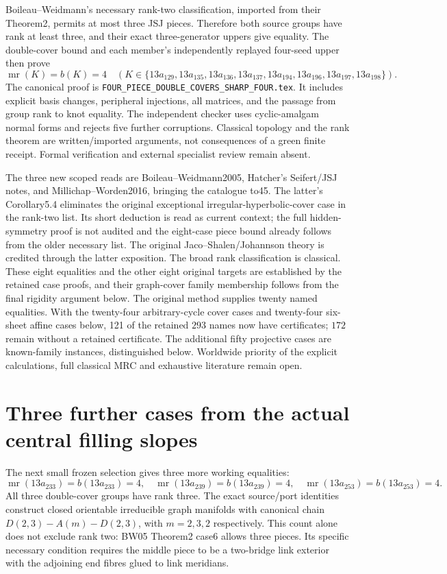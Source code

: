 \documentclass[11pt]{article}
\newcommand{\mr}{\operatorname{mr}}
\begin{document}
Boileau--Weidmann's necessary rank-two classification, imported from
their Theorem2, permits at most three JSJ pieces. Therefore both source
groups have rank at least three, and their exact three-generator uppers
give equality. The double-cover bound and each member's independently
replayed four-seed upper then prove
\[
 \mr(K)=b(K)=4\quad
 (K\in\{13a_{129},13a_{135},13a_{136},13a_{137},
        13a_{194},13a_{196},13a_{197},13a_{198}\}).
\]
The canonical proof is \texttt{FOUR\_PIECE\_DOUBLE\_COVERS\_SHARP\_FOUR.tex}.
It includes explicit basis changes, peripheral injections, all matrices,
and the passage from group rank to knot equality. The independent
checker uses cyclic-amalgam normal forms and rejects five further
corruptions. Classical topology and the rank theorem are written/imported
arguments, not consequences of a green finite receipt. Formal verification
and external specialist review remain absent.

The three new scoped reads are Boileau--Weidmann2005, Hatcher's
Seifert/JSJ notes, and Millichap--Worden2016, bringing the catalogue to45.
The latter's Corollary5.4 eliminates the original exceptional
irregular-hyperbolic-cover case in the rank-two list. Its short deduction
is read as current context; the full hidden-symmetry proof is not audited
and the eight-case piece bound already follows from the older necessary
list. The original
Jaco--Shalen/Johannson theory is credited through the latter exposition.
The broad rank classification is classical. These eight equalities and
the other eight original targets are established by the retained case
proofs, and their graph-cover family membership follows from the final
rigidity argument below. The original method supplies twenty named equalities. With the
twenty-four arbitrary-cycle cover cases and twenty-four six-sheet
affine cases below, 121 of the retained $293$ names now have certificates; $172$ remain without
a retained certificate. The additional fifty projective cases are
known-family instances, distinguished below. Worldwide priority of
the explicit calculations, full classical MRC and exhaustive literature
remain open.

\clearpage
\section{Three further cases from the actual central filling slopes}

The next small frozen selection gives three more working equalities:
\[
 \mr(13a_{233})=b(13a_{233})=4,\quad
 \mr(13a_{239})=b(13a_{239})=4,\quad
 \mr(13a_{253})=b(13a_{253})=4.
\]
All three double-cover groups have rank three. The exact source/port
identities construct closed orientable irreducible graph manifolds with
canonical chain $D(2,3)-A(m)-D(2,3)$, with $m=2,3,2$ respectively.
This count alone does not exclude rank two: BW05 Theorem2 case6 allows
three pieces. Its specific necessary condition requires the middle piece
to be a two-bridge link exterior with the adjoining end fibres glued to
link meridians.
\end{document}
